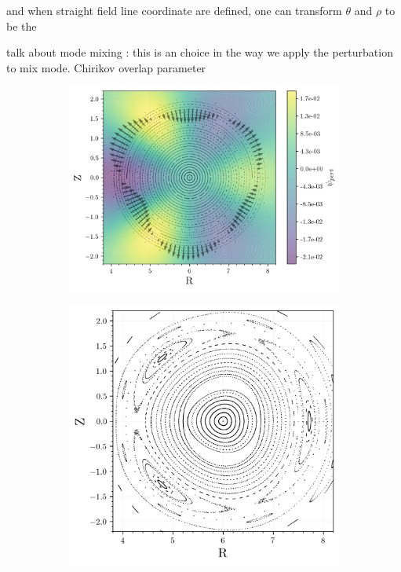 and when straight field line coordinate are defined, one can transform $\theta$ and $\rho$ to be the 

talk about mode mixing : this is an choice in the way we apply the perturbation to mix mode.
Chirikov overlap parameter

\begin{figure}[h!]
    \centering
    \begin{subfigure}[t]{0.55\textwidth}
        \centering
        \includegraphics[width=\textwidth]{images/high-aspect-ratio/psi_pert.png}
        \caption{}
        \label{fig:toyha-32-psi}
    \end{subfigure}
    \hfill
    \begin{subfigure}[t]{0.43\textwidth}
        \centering
        \includegraphics[width=\textwidth]{images/high-aspect-ratio/perturbed_3_2.png}
        \caption{}
        \label{fig:toyha-32-p}
    \end{subfigure}
    \caption{}
    \label{fig:toyha-32}
\end{figure}

